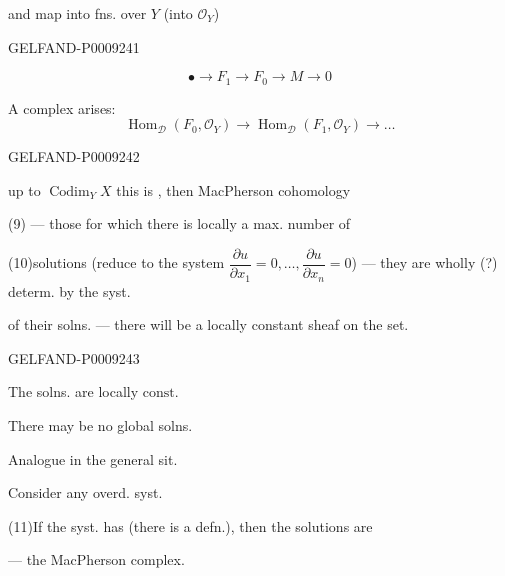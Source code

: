 and map into fns. over $Y$ (into $\mathcal O_Y$)


\begin{GelfandAdjacentEvidence}{GELFAND-P000924}{1}

\[\bullet\longrightarrow F_1\longrightarrow F_0\longrightarrow M\longrightarrow0\]

A complex arises:
\begin{equation*}
 \operatorname{Hom}_{\mathcal D}(F_0,\mathcal O_Y)
 \longrightarrow \operatorname{Hom}_{\mathcal D}(F_1,\mathcal O_Y)
 \longrightarrow\ldots
 \tag{8}
\end{equation*}
\end{GelfandAdjacentEvidence}
\begin{GelfandAdjacentEvidence}{GELFAND-P000924}{2}


up to $\operatorname{Codim}_Y X$ this is , then MacPherson cohomology

(9)\quad {} --- those for which there is locally a max. number of

(10)\quad solutions (reduce to the system $\dfrac{\partial u}{\partial x_1}=0,\ldots,\dfrac{\partial u}{\partial x_n}=0$) --- they are wholly (?) determ. by the syst.

of their solns. --- there will be a locally constant sheaf on the set.
\end{GelfandAdjacentEvidence}
\begin{GelfandAdjacentEvidence}{GELFAND-P000924}{3}


The solns. are locally $\mathrm{const}$.

There may be no global solns.

Analogue in the general sit.

Consider any overd. syst.

(11)\quad If the syst. has  (there is a defn.), then the solutions are

--- the MacPherson complex.
\end{GelfandAdjacentEvidence}
